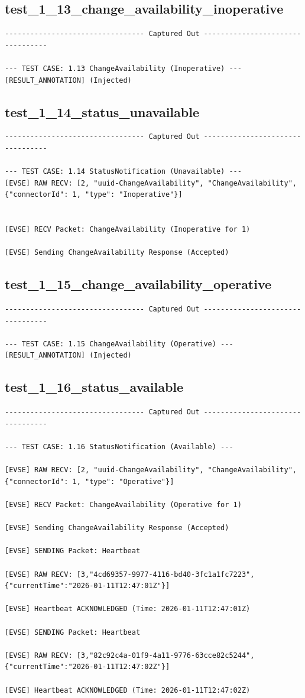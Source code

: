 \documentclass{article}
\begin{document}
\subsection*{test\_1\_13\_change\_availability\_inoperative}
\begin{lstlisting}
--------------------------------- Captured Out ---------------------------------

--- TEST CASE: 1.13 ChangeAvailability (Inoperative) ---
[RESULT_ANNOTATION] (Injected)
\end{lstlisting}
\subsection*{test\_1\_14\_status\_unavailable}
\begin{lstlisting}
--------------------------------- Captured Out ---------------------------------

--- TEST CASE: 1.14 StatusNotification (Unavailable) ---
[EVSE] RAW RECV: [2, "uuid-ChangeAvailability", "ChangeAvailability", {"connectorId": 1, "type": "Inoperative"}]


[EVSE] RECV Packet: ChangeAvailability (Inoperative for 1)

[EVSE] Sending ChangeAvailability Response (Accepted)
\end{lstlisting}
\subsection*{test\_1\_15\_change\_availability\_operative}
\begin{lstlisting}
--------------------------------- Captured Out ---------------------------------

--- TEST CASE: 1.15 ChangeAvailability (Operative) ---
[RESULT_ANNOTATION] (Injected)
\end{lstlisting}
\subsection*{test\_1\_16\_status\_available}
\begin{lstlisting}
--------------------------------- Captured Out ---------------------------------

--- TEST CASE: 1.16 StatusNotification (Available) ---

[EVSE] RAW RECV: [2, "uuid-ChangeAvailability", "ChangeAvailability", {"connectorId": 1, "type": "Operative"}]

[EVSE] RECV Packet: ChangeAvailability (Operative for 1)

[EVSE] Sending ChangeAvailability Response (Accepted)

[EVSE] SENDING Packet: Heartbeat

[EVSE] RAW RECV: [3,"4cd69357-9977-4116-bd40-3fc1a1fc7223",{"currentTime":"2026-01-11T12:47:01Z"}]

[EVSE] Heartbeat ACKNOWLEDGED (Time: 2026-01-11T12:47:01Z)

[EVSE] SENDING Packet: Heartbeat

[EVSE] RAW RECV: [3,"82c92c4a-01f9-4a11-9776-63cce82c5244",{"currentTime":"2026-01-11T12:47:02Z"}]

[EVSE] Heartbeat ACKNOWLEDGED (Time: 2026-01-11T12:47:02Z)
\end{lstlisting}
\end{document}

